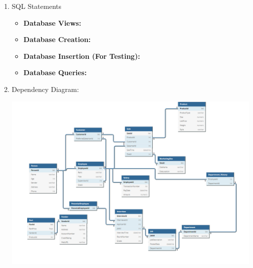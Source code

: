\documentclass[12pt]{article}
\begin{document}
\begin{enumerate}
		\pagebreak			
			
		\item SQL Statements
			\begin{itemize}
				\item \textbf{Database Views:}
						
				
				\pagebreak

				\item \textbf{Database Creation:}
				
				
				\pagebreak				
				
				\item \textbf{Database Insertion (For Testing):}
										
				
				\pagebreak				
				
				\item \textbf{Database Queries:}
					
			\end{itemize}
	
		\item Dependency Diagram:
			\begin{center}
				\includegraphics[scale=.55]{completed_diags/depend}
			\end{center}
		

\end{enumerate}
\end{document}
